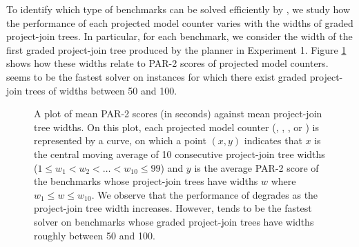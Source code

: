 To identify which type of benchmarks can be solved efficiently by \procount{}, we study how the performance of each projected model counter varies with the widths of graded project-join trees.
In particular, for each benchmark, we consider the width of the first graded project-join tree produced by the planner \Lg{} in Experiment 1.
Figure \ref{time_vs_width} shows how these widths relate to PAR-2 scores of projected model counters. 
\procount{} seems to be the fastest solver on instances for which there exist graded project-join trees of widths between 50 and 100.
\begin{figure}[t]
    \centering
    
    \vspace*{-0.9cm}
    \caption{
        A plot of mean PAR-2 scores (in seconds) against mean project-join tree widths.
        On this plot, each projected model counter (\procount{}, \dfp{}, \projmc, or \ssat) is represented by a curve, on which a point $(x, y)$ indicates that $x$ is the central moving average of 10 consecutive project-join tree widths ($1 \le w_1 < w_2 < \ldots < w_{10} \le 99$) and $y$ is the average PAR-2 score of the benchmarks whose project-join trees have widths $w$ where $w_1 \le w \le w_{10}$.
        We observe that the performance of \procount{} degrades as the project-join tree width increases.
        However, \procount{} tends to be the fastest solver on benchmarks whose graded project-join trees have widths roughly between 50 and 100.
    }
    \label{time_vs_width}
\end{figure}
